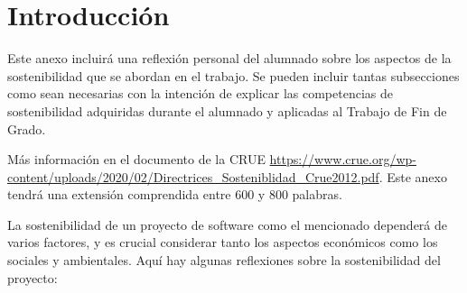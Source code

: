 
\section{Introducción}
Este anexo incluirá una reflexión personal del alumnado sobre los aspectos de la sostenibilidad que se abordan en el trabajo.
Se pueden incluir tantas subsecciones como sean necesarias con la intención de explicar las competencias de sostenibilidad adquiridas durante el alumnado y aplicadas al Trabajo de Fin de Grado.

Más información en el documento de la CRUE \url{https://www.crue.org/wp-content/uploads/2020/02/Directrices_Sosteniblidad_Crue2012.pdf}.
Este anexo tendrá una extensión comprendida entre 600 y 800 palabras.

La sostenibilidad de un proyecto de software como el mencionado dependerá de varios factores, y es crucial considerar tanto los aspectos económicos como los sociales y ambientales. Aquí hay algunas reflexiones sobre la sostenibilidad del proyecto:

